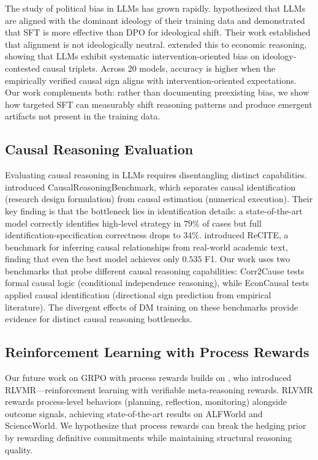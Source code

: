 \documentclass{article}
\begin{document}
The study of political bias in LLMs has grown rapidly. \citet{kronlund2024propaganda} hypothesized that LLMs are aligned with the dominant ideology of their training data and demonstrated that SFT is more effective than DPO for ideological shift. Their work established that alignment is not ideologically neutral. \citet{lee2026ideological} extended this to economic reasoning, showing that LLMs exhibit systematic intervention-oriented bias on ideology-contested causal triplets. Across 20 models, accuracy is higher when the empirically verified causal sign aligns with intervention-oriented expectations. Our work complements both: rather than documenting preexisting bias, we show how targeted SFT can measurably shift reasoning patterns and produce emergent artifacts not present in the training data.

\subsection{Causal Reasoning Evaluation}

Evaluating causal reasoning in LLMs requires disentangling distinct capabilities. \citet{syrgkanis2026causalreasoning} introduced CausalReasoningBenchmark, which separates causal identification (research design formulation) from causal estimation (numerical execution). Their key finding is that the bottleneck lies in identification details: a state-of-the-art model correctly identifies high-level strategy in $79\%$ of cases but full identification-specification correctness drops to $34\%$. \citet{saklad2025recite} introduced ReCITE, a benchmark for inferring causal relationships from real-world academic text, finding that even the best model achieves only $0.535$ F1. Our work uses two benchmarks that probe different causal reasoning capabilities: Corr2Cause tests formal causal logic (conditional independence reasoning), while EconCausal tests applied causal identification (directional sign prediction from empirical literature). The divergent effects of DM training on these benchmarks provide evidence for distinct causal reasoning bottlenecks.

\subsection{Reinforcement Learning with Process Rewards}

Our future work on GRPO with process rewards builds on \citet{zhang2025rlvmr}, who introduced RLVMR---reinforcement learning with verifiable meta-reasoning rewards. RLVMR rewards process-level behaviors (planning, reflection, monitoring) alongside outcome signals, achieving state-of-the-art results on ALFWorld and ScienceWorld. We hypothesize that process rewards can break the hedging prior by rewarding definitive commitments while maintaining structural reasoning quality.
\end{document}
